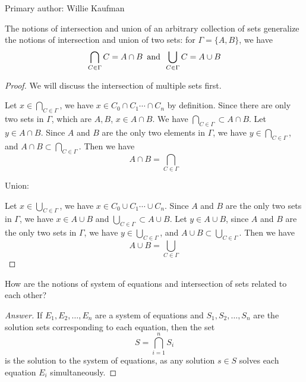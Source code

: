             Primary author: Willie Kaufman

\begin{majorEx}%
    The notions of intersection and union of an arbitrary collection of sets
    generalize the notions of intersection and union of two sets: for $\Gamma =
    \{A, B\}$, we have 
    $$
    \bigcap_{C \in \Gamma} C = A \cap B \hspace{5pt} \text{\normalfont and}
    \hspace{5pt} \bigcup_{C \in \Gamma} C = A \cup B
    $$
\end{majorEx}

\begin{proof}

    We will discuss the intersection of multiple sets first.

    Let $x \in \bigcap_{C \in \Gamma}$, we have $x \in C_0 \cap C_1 \cdots \cap
    C_n$ by definition. Since there are only two sets in $\Gamma$, which are $A,
    B$, $x \in A \cap B$. We have $\bigcap_{C \in \Gamma} \subset A \cap B$. Let
    $y \in A \cap B$. Since $A$ and $B$ are the only two elements in $\Gamma$,
    we have $y \in \bigcap_{C \in \Gamma}$, and $A \cap B \subset \bigcap_{C \in
    \Gamma}$. Then we have $$A \cap B = \bigcap_{C \in \Gamma}$$

    Union:

    Let $x \in \bigcup_{C \in \Gamma}$, we have $x \in C_0 \cup C_1 \cdots \cup
    C_n$. Since $A$ and $B$ are the only two sets in $\Gamma$, we have $x \in A
    \cup B$ and $\bigcup_{C \in \Gamma} \subset A \cup B$. Let $y \in A \cup B$,
    since $A$ and $B$ are the only two sets in $\Gamma$, we have $y \in
    \bigcup_{C \in \Gamma}$, and $A \cup B \subset \bigcup_{C \in \Gamma}$. Then
    we have $$A \cup B = \bigcup_{C \in \Gamma}$$
\end{proof}


\begin{minorEx}%
    [Riddle]
    How are the notions of system of equations and intersection of sets related
    to each other?
\end{minorEx}

\begin{proof}
    [Answer]
    If $E_1, E_2, \ldots, E_n$ are a system of equations and $S_1, S_2, \ldots,
    S_n$ are the solution sets corresponding to each equation, then the set
    \[
        S = \bigcap_{i=1}^{n} S_i
    \]
    is the solution to the system of equations, as any solution $s \in S$ solves
    each equation $E_i$ simultaneously.
\end{proof}

